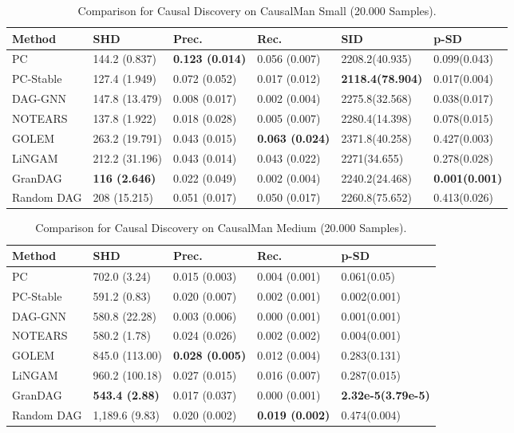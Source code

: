 \begin{table}[ht]
\centering
\begin{tabular}{ p{1.7cm}|p{2.1cm}|p{1.9cm}|p{1.9cm}|p{2.2cm}|p{2cm}} 
Method & SHD & Prec. & Rec.& SID & p-SD\\
\hline
PC & 144.2 (0.837) & \textbf{0.123 (0.014)} & 0.056 (0.007) & 2208.2(40.935) & 0.099(0.043)\\ 
PC-Stable & 127.4 (1.949) & 0.072 (0.052) & 0.017 (0.012) & \textbf{2118.4(78.904)}& 0.017(0.004)\\
DAG-GNN & 147.8 (13.479) & 0.008 (0.017) & 0.002 (0.004) & 2275.8(32.568)& 0.038(0.017)\\
NOTEARS & 137.8 (1.922) & 0.018 (0.028) & 0.005 (0.007) & 2280.4(14.398)& 0.078(0.015)\\ 
GOLEM & 263.2 (19.791) & 0.043 (0.015) & \textbf{0.063 (0.024)}& 2371.8(40.258)& 0.427(0.003)\\ 
LiNGAM & 212.2 (31.196) & 0.043 (0.014)& 0.043 (0.022) & 2271(34.655)& 0.278(0.028)\\
GranDAG & \textbf{116 (2.646)} & 0.022 (0.049) & 0.002 (0.004) & 2240.2(24.468)& \textbf{0.001(0.001)}\\
Random DAG & 	208 (15.215) & 0.051 (0.017) & 0.050 (0.017) & 2260.8(75.652)& 0.413(0.026)\\
\end{tabular}
\caption{Comparison for Causal Discovery on CausalMan Small (20.000 Samples).}
\label{table:causal_discovery_small}
\end{table}


\begin{table}[ht]
\centering
\begin{tabular}{ p{1.8cm}|p{2.1cm}|p{2cm}|p{2cm}|p{2.4cm}} 
Method & SHD & Prec. & Rec. & p-SD \\
\hline
PC & 702.0 (3.24) & 0.015 (0.003) & 0.004 (0.001) & 0.061(0.05)\\ 
PC-Stable & 591.2 (0.83) & 0.020 (0.007) & 0.002 (0.001) & 0.002(0.001)\\
DAG-GNN & 	580.8 (22.28) & 0.003 (0.006) & 0.000 (0.001)& 0.001(0.001)
 \\
NOTEARS & 580.2 (1.78) & 0.024 (0.026) & 0.002 (0.002) & 0.004(0.001)\\ 
GOLEM &  845.0 (113.00) &\textbf{0.028 (0.005)} & 0.012 (0.004)& 0.283(0.131)\\ 
LiNGAM & 960.2 (100.18) & 0.027 (0.015) & 0.016 (0.007)& 0.287(0.015)\\
GranDAG & \textbf{543.4 (2.88)} & 0.017 (0.037) & 0.000 (0.001)& \textbf{2.32e-5(3.79e-5)}\\
Random DAG & 1,189.6 (9.83) & 0.020 (0.002) & \textbf{0.019 (0.002)}& 0.474(0.004)\\
\end{tabular}
\caption{Comparison for Causal Discovery on CausalMan Medium (20.000 Samples).}
\label{table:causal_discovery_medium}
\end{table}



